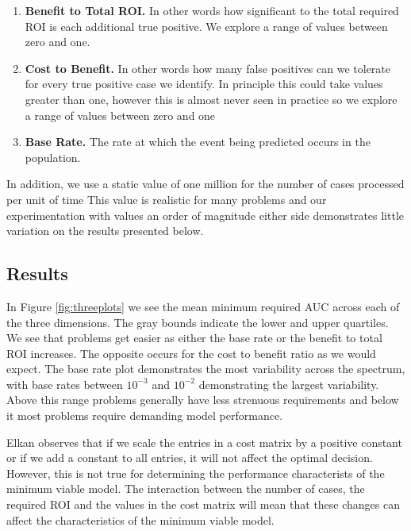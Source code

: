 \documentclass[12pt,a4paper]{article}
\numberwithin{equation}{section}
\begin{document}
\begin{enumerate}
        \item \textbf{Benefit to Total ROI.} In other words how significant to the total required ROI is
each additional true positive. We explore a range of values between zero and one.

        \item \textbf{Cost to Benefit.} In other words how many false positives can we tolerate for every
true positive case we identify. In principle this could take values greater than one, however this
is almost never seen in practice so we explore a range of values between zero and one

        \item \textbf{Base Rate.} The rate at which the event being predicted occurs in the population.

\end{enumerate}

In addition, we use a static value of one million for the number of cases processed per unit of time
This value is realistic for many problems and our experimentation with values
an order of magnitude either side demonstrates little variation on the results presented below.

\subsection{Results}

In Figure \ref{fig:threeplots} we see the mean minimum required AUC across each of the three dimensions.
The gray bounds indicate the lower and upper quartiles. We see that problems get easier as either the base
rate or the benefit to total ROI increases. The opposite occurs for the cost to benefit ratio as we would 
expect. The base rate plot demonstrates the most variability across the spectrum, with base rates between
$10^{-3}$ and $10^{-2}$ demonstrating the largest variability. Above this range problems generally have less
strenuous requirements and below it most problems require demanding model performance.

Elkan \cite{Elkan2001} observes that if we scale the entries in a cost matrix by a positive constant or if
we add a constant to all entries, it will not affect the optimal decision. However, this
is not true for determining the performance characterists of the minimum viable model. 
The interaction between the number of cases, the required ROI and the values in the cost
matrix will mean that these changes can affect the characteristics of the minimum viable model. 
\end{document}
